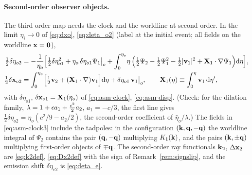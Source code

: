 \paragraph{Second-order observer objects.}  The third-order map needs the clock and the worldline at second order.  In the limit
$\eta_i\to0$ of \eqref{eq:dxo}, \eqref{eq:deta_o2} (label at the initial event; all fields on the worldline $\mathbf x=\mathbf 0$),
\begin{align}
\tfrac12\delta\eta_{o2}&=-\frac1{\eta_o}\Big[\tfrac12\delta\eta_{o1}^2+\eta_o\,\delta\eta_{o1}\Psi_1\big|_o+\int_0^{\eta_o}\!\eta\,\Big(\tfrac12\Psi_2-\tfrac12\Psi_1^2-\tfrac12|\mathbf v_1|^2
+\mathbf X_1\cdot\nabla\Psi_1\Big)\mathrm d\eta\Big],\nonumber\\
\tfrac12\delta\mathbf x_{o2}&=\int_0^{\eta_o}\!\Big[\tfrac12\mathbf v_2+(\mathbf X_1\cdot\nabla)\mathbf v_1\Big]\mathrm d\eta+\delta\eta_{o1}\,\mathbf v_1\big|_o,\qquad \mathbf X_1(\eta)\equiv\int_0^\eta\mathbf v_1\,\mathrm d\eta',
\label{eq:asm-clock3}
\end{align}
with $\delta\eta_{o1}$, $\delta\mathbf x_{o1}=\mathbf X_1(\eta_o)$ of \eqref{eq:asm-clock}, \eqref{eq:asm-disp}.  (Check: for the dilation family, $\lambda=1+\epsilon a_1+\tfrac{\epsilon^2}2a_2$,
$a_1=-c/3$, the first line gives $\tfrac12\delta\eta_{o2}=\eta_o(c^2/9-a_2/2)$, the second-order coefficient of $\bar\eta_o/\lambda$.)  The fields in
\eqref{eq:asm-clock3} include the tadpoles: in the configuration $(\mathbf k,\mathbf q,-\mathbf q)$ the worldline integral of $\Psi_2$ contains the pair
$(\mathbf q,-\mathbf q)$ multiplying $K_1(\mathbf k)$, and the pairs $(\mathbf k,\pm\mathbf q)$ multiplying first-order objects of $\mp\mathbf q$.  The second-order ray
functionals $\mathbf k_2$, $\Delta\mathbf x_2$ are \eqref{eq:k2def}, \eqref{eq:Dx2def} with the sign of Remark~\ref{rem:signslip}, and the emission shift
$\delta\eta_{e2}$ is \eqref{eq:deta_e}.

